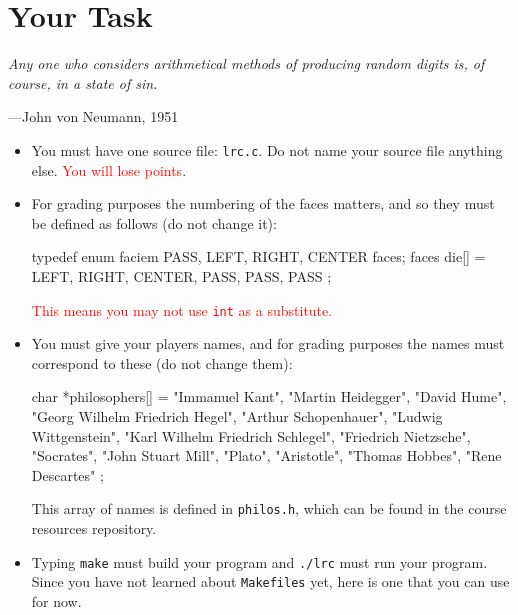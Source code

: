 \documentclass{article}
\begin{document}

\section{Your Task}
\textwidth
\epigraph{
\emph{Any one who considers arithmetical methods of producing random digits
is, of course, in a state of sin.}}{---John von Neumann, 1951}\noindent

\begin{itemize}

\item You must have one source file: \texttt{lrc.c}. Do not name
your source file anything else. \textcolor{red}{You will lose points}.


\item For grading purposes the numbering of the faces matters, and
so they must be defined as follows (do not change it):

\begin{codelisting}{}
typedef enum faciem { PASS, LEFT, RIGHT, CENTER } faces;
faces die[] = { LEFT, RIGHT, CENTER, PASS, PASS, PASS };
\end{codelisting}

\textcolor{red}{This means you may not use \texttt{int} as a substitute.}

\item You must give your players names, and for grading purposes the names
must correspond to these (do not change them):

\begin{codelisting}{}
char *philosophers[] = { "Immanuel Kant",
                         "Martin Heidegger",
                         "David Hume",
                         "Georg Wilhelm Friedrich Hegel",
                         "Arthur Schopenhauer",
                         "Ludwig Wittgenstein",
                         "Karl Wilhelm Friedrich Schlegel",
                         "Friedrich Nietzsche",
                         "Socrates",
                         "John Stuart Mill",
                         "Plato",
                         "Aristotle",
                         "Thomas Hobbes",
                         "Rene Descartes" };
\end{codelisting}

This array of names is defined in \texttt{philos.h}, which can be found in
the course resources repository.

\item Typing \texttt{make} must build your program and
\texttt{./lrc} must run your program. Since you have not learned
about \texttt{Makefiles} yet, here is one that you can use for now.


\end{itemize}
\end{document}
